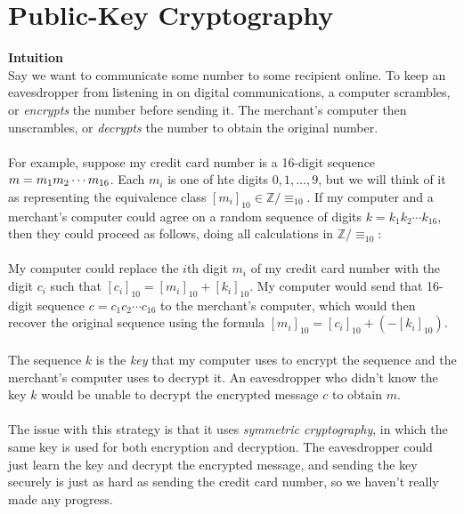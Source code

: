 \documentclass{report}
\theoremstyle{definition}
\begin{document}
\section{Public-Key Cryptography}
\textbf{Intuition}\\
Say we want to communicate some number to some recipient online. 
To keep an eavesdropper from listening in on digital communications, a computer scrambles, or \textit{encrypts} the number before sending it. The 
merchant's computer then unscrambles, or \textit{decrypts} the number to obtain the original number.\\
\vspace{1mm}\\
For example, suppose my credit card number is a 16-digit sequence $m=\\m_1m_2\cdots m_{16}$. Each $m_i$ is one of hte digits $0,1,\ldots,9$, but
we will think of it as representing the equivalence class $[m_i]_{10}\in\mathbb Z/\equiv_{10}$. If my computer and a merchant's computer could agree
on a random sequence of digits $k=k_1k_2\cdots k_{16}$, then they could proceed as follows, doing all calculations in $\mathbb Z/\equiv_{10}$:\\
\vspace{1mm}\\
My computer could replace the $i$th digit $m_i$ of my credit card number with the digit $c_i$ such that $[c_i]_{10}=[m_i]_{10}+[k_i]_{10}$.
My computer would send that 16-digit sequence $c=c_1c_2\cdots c_{16}$ to the merchant's computer, which would then recover the original sequence
using the formula $[m_i]_{10}=[c_i]_{10}+(-[k_i]_{10})$.\\
\vspace{1mm}\\
The sequence $k$ is the \textit{key} that my computer uses to encrypt the sequence and the merchant's computer uses to decrypt it. 
An eavesdropper who didn't know the key $k$ would be unable to decrypt the encrypted message $c$ to obtain $m$.\\
\vspace{1mm}\\
The issue with this strategy is that it uses \textit{symmetric cryptography}, in which the same key is used for both encryption and decryption. The
eavesdropper could just learn the key and decrypt the encrypted message, and sending the key securely is just as hard as sending the credit card
number, so we haven't really made any progress.\\
\vspace{1mm}\\
\end{document}
